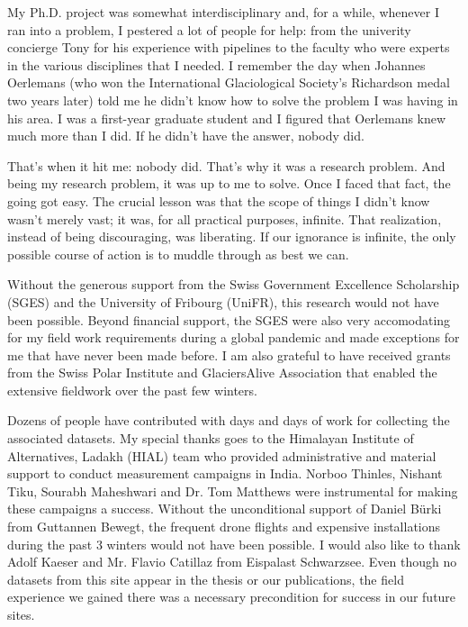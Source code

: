 My Ph.D. project was somewhat interdisciplinary and, for a while, whenever I ran into a problem, I pestered a
lot of people for help: from the univerity concierge Tony for his experience with pipelines to the faculty who
were experts in the various disciplines that I needed. I remember the day when Johannes Oerlemans (who won the
International Glaciological Society's Richardson medal two years later) told me he didn't know how to solve the
problem I was having in his area. I was a first-year graduate student and I figured that Oerlemans knew much
more than I did. If he didn't have the answer, nobody did.

That's when it hit me: nobody did. That's why it was a research problem. And being my research problem, it was
up to me to solve. Once I faced that fact, the going got easy. The crucial lesson was that the scope of things I
didn't know wasn't merely vast; it was, for all practical purposes, infinite. That realization, instead of being
discouraging, was liberating. If our ignorance is infinite, the only possible course of action is to muddle
through as best we can.

Without the generous support from the Swiss Government Excellence Scholarship (SGES) and the University of
Fribourg (UniFR), this research would not have been possible. Beyond financial support, the SGES were also very
accomodating for my field work requirements during a global pandemic and made exceptions for me that have never
been made before. I am also grateful to have received grants from the Swiss Polar Institute and GlaciersAlive
Association that enabled the extensive fieldwork over the past few winters. 

Dozens of people have contributed with days and days of work for collecting the associated datasets. My special
thanks goes to the Himalayan Institute of Alternatives, Ladakh (HIAL) team who provided administrative and
material support to conduct measurement campaigns in India. Norboo Thinles, Nishant Tiku, Sourabh Maheshwari and
Dr. Tom Matthews were instrumental for making these campaigns a success. Without the unconditional support of
Daniel Bürki from Guttannen Bewegt, the frequent drone flights and expensive installations during the past 3
winters would not have been possible. I would also like to thank Adolf Kaeser and Mr. Flavio Catillaz from
Eispalast Schwarzsee. Even though no datasets from this site appear in the thesis or our publications, the field
experience we gained there was a necessary precondition for success in our future sites. 

